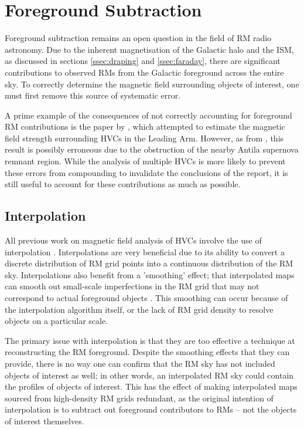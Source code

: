 \chapter{Foreground Subtraction}
\label{cha:FR}

Foreground subtraction remains an open question in the field of RM radio astronomy. Due to the inherent magnetisation of the Galactic halo and the ISM, as discussed in sections \ref{ssec:draping} and \ref{ssec:faraday}, there are significant contributions to observed RMs from the Galactic foreground across the entire sky. To correctly determine the magnetic field surrounding objects of interest, one must first remove this source of systematic error.


A prime example of the consequences of not correctly accounting for foreground RM contributions is the paper by \cite{ID2}, which attempted to estimate the magnetic field strength surrounding HVCs in the Leading Arm. However, as from \cite{ID36}, this result is possibly erroneous due to the obstruction of the nearby Antila supernova remnant region. While the analysis of multiple HVCs is more likely to prevent these errors from compounding to invalidate the conclusions of the report, it is still useful to account for these contributions as much as possible.

\section{Interpolation}
\label{sec:intp}

All previous work on magnetic field analysis of HVCs involve the use of interpolation \citep{ID3, ID5, ID6, ID26, ID73}. Interpolations are very beneficial due to its ability to convert a discrete distribution of RM grid points into a continuous distribution of the RM sky. Interpolations also benefit from a 'smoothing' effect; that interpolated maps can smooth out small-scale imperfections in the RM grid that may not correspond to actual foreground objects \citep{ID44, ID45, ID58}. This smoothing can occur because of the interpolation algorithm itself, or the lack of RM grid density to resolve objects on a particular scale.


The primary issue with interpolation is that they are too effective a technique at reconstructing the RM foreground. Despite the smoothing effects that they can provide, there is no way one can confirm that the RM sky has not included objects of interest as well; in other words, an interpolated RM sky could contain the profiles of objects of interest. This has the effect of making interpolated maps sourced from high-density RM grids redundant, as the original intention of interpolation is to subtract out foreground contributors to RMs – not the objects of interest themselves.


